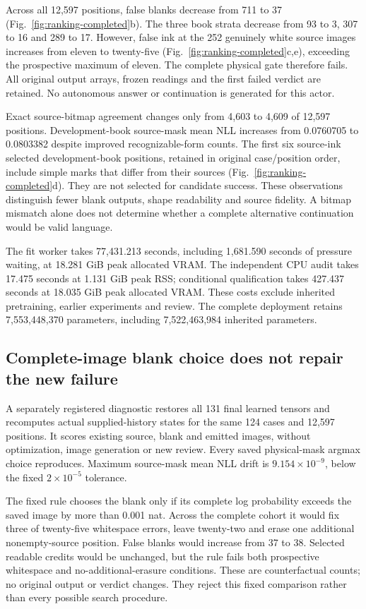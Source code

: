 \documentclass[12pt,a4paper]{article}
\providecommand{\DIFadd}[1]{{\protect\color{blue} \sf #1}} %
\begin{document}
\DIFadd{Across all 12,597 positions, false blanks decrease from 711 to 37
(Fig.~\ref{fig:ranking-completed}b). The three book strata decrease from
93 to 3, 307 to 16 and 289 to 17. However, false ink at the 252 genuinely
white source images increases from eleven to twenty-five
(Fig.~\ref{fig:ranking-completed}c,e), exceeding the prospective maximum of
eleven. The complete physical gate therefore fails. All original output
arrays, frozen readings and the first failed verdict are retained. No
autonomous answer or continuation is generated for this actor.
}

\DIFadd{Exact source-bitmap agreement changes only from 4,603 to 4,609 of 12,597
positions. Development-book source-mask mean NLL increases from 0.0760705 to
0.0803382 despite improved recognizable-form counts. The first six source-ink
selected development-book positions, retained in original case/position order,
include simple marks that differ from their sources
(Fig.~\ref{fig:ranking-completed}d). They are not selected for candidate success.
These observations distinguish fewer blank outputs, shape readability and
source fidelity. A bitmap mismatch alone does not determine whether a complete
alternative continuation would be valid language.
}

\DIFadd{The fit worker takes 77,431.213 seconds, including 1,681.590 seconds of pressure
waiting, at 18.281 GiB peak allocated VRAM. The independent CPU audit takes
17.475 seconds at 1.131 GiB peak RSS; conditional qualification takes 427.437
seconds at 18.035 GiB peak allocated VRAM. These costs exclude inherited
pretraining, earlier experiments and review. The complete deployment retains
7,553,448,370 parameters, including 7,522,463,984 inherited parameters.
}

\subsection*{\DIFadd{Complete-image blank choice does not repair the new failure}}

\DIFadd{A separately registered diagnostic restores all 131 final learned tensors and
recomputes actual supplied-history states for the same 124 cases and 12,597
positions. It scores existing source, blank and emitted images, without
optimization, image generation or new review. Every saved physical-mask argmax
choice reproduces. Maximum source-mask mean NLL drift is
$9.154\times10^{-9}$, below the fixed $2\times10^{-5}$ tolerance.
}

\DIFadd{The fixed rule chooses the blank only if its complete log probability exceeds
the saved image by more than 0.001 nat. Across the complete cohort it would fix
three of twenty-five whitespace errors, leave twenty-two and erase one
additional nonempty-source position. False blanks would increase from 37 to
38. Selected readable credits would be unchanged, but the rule fails both
prospective whitespace and no-additional-erasure conditions. These are
counterfactual counts; no original output or verdict changes. They reject this
fixed comparison rather than every possible search procedure.
}
\end{document}
